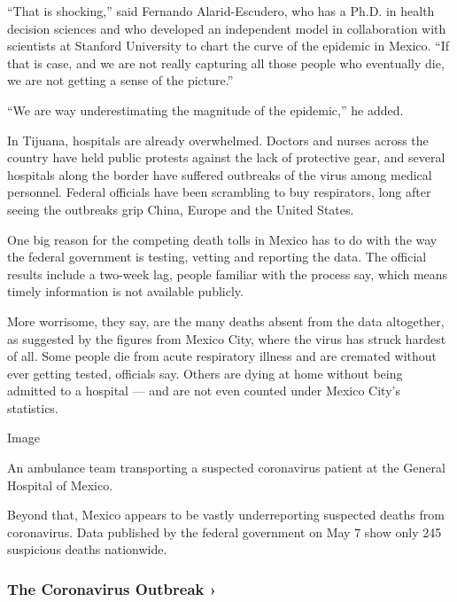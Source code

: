 ``That is shocking,'' said Fernando Alarid-Escudero, who has a Ph.D. in
health decision sciences and who developed an independent model in
collaboration with scientists at Stanford University to chart the curve
of the epidemic in Mexico. ``If that is case, and we are not really
capturing all those people who eventually die, we are not getting a
sense of the picture.''

``We are way underestimating the magnitude of the epidemic,'' he added.

In Tijuana, hospitals are already overwhelmed. Doctors and nurses across
the country have held public protests against the lack of protective
gear, and several hospitals along the border have suffered outbreaks of
the virus among medical personnel. Federal officials have been
scrambling to buy respirators, long after seeing the outbreaks grip
China, Europe and the United States.

One big reason for the competing death tolls in Mexico has to do with
the way the federal government is testing, vetting and reporting the
data. The official results include a two-week lag, people familiar with
the process say, which means timely information is not available
publicly.

More worrisome, they say, are the many deaths absent from the data
altogether, as suggested by the figures from Mexico City, where the
virus has struck hardest of all. Some people die from acute respiratory
illness and are cremated without ever getting tested, officials say.
Others are dying at home without being admitted to a hospital --- and
are not even counted under Mexico City's statistics.

Image

An ambulance team transporting a suspected coronavirus patient at the
General Hospital of Mexico.

Beyond that, Mexico appears to be vastly underreporting suspected deaths
from coronavirus. Data published by the federal government on May 7 show
only 245 suspicious deaths nationwide.

\href{https://www.nytimes.com/news-event/coronavirus?action=click\&pgtype=Article\&state=default\&region=MAIN_CONTENT_3\&context=storylines_faq}{}

\hypertarget{the-coronavirus-outbreak-}{%
\subsubsection{The Coronavirus Outbreak
›}\label{the-coronavirus-outbreak-}}

